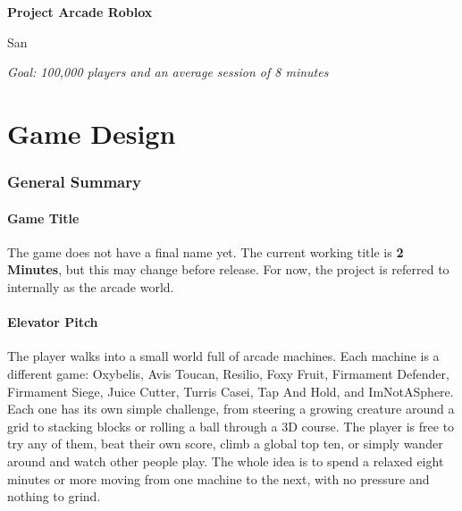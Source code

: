 \documentclass[12pt,letterpaper]{article}
\begin{document}
\begin{titlepage}
  \centering
  \vspace*{\fill}
  {\Huge \textbf{Project Arcade Roblox}\par}
  \vspace{2cm}
  {\Large San\par}
  \vspace*{\fill}
  {\large\itshape Goal: 100{,}000 players and an average session of 8 minutes\par}
  \vspace{1.5cm}
\end{titlepage}

\tableofcontents
\newpage
{}

\part{Game Design}

\section{General Summary}

\subsection{Game Title}

The game does not have a final name yet. The current working title is \textbf{2 Minutes}, but this may change before release. For now, the project is referred to internally as the arcade world.

\subsection{Elevator Pitch}

The player walks into a small world full of arcade machines. Each machine is a different game: Oxybelis, Avis Toucan, Resilio, Foxy Fruit, Firmament Defender, Firmament Siege, Juice Cutter, Turris Casei, Tap And Hold, and ImNotASphere. Each one has its own simple challenge, from steering a growing creature around a grid to stacking blocks or rolling a ball through a 3D course. The player is free to try any of them, beat their own score, climb a global top ten, or simply wander around and watch other people play. The whole idea is to spend a relaxed eight minutes or more moving from one machine to the next, with no pressure and nothing to grind.
\end{document}
